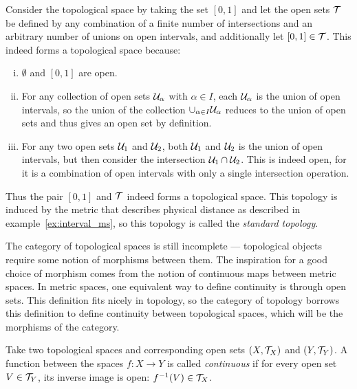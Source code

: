 \documentclass[../sean_thesis.tex]{subfiles}
\begin{document}
\begin{example}
	Consider the topological space by taking the set $[0,1]$ and let the open sets $\mathcal{T}$ be defined by any combination of a finite number of intersections and an arbitrary number of unions on open intervals, and additionally let $[0,1] \in \mathcal{T}$. This indeed forms a topological space because: 
\vspace{-\parskip}
	\begin{enumerate}[(i)]	
		\item $\emptyset$ and $[0,1]$ are open. 
		\item For any collection of open sets $\mathcal{U}_\alpha$ with $\alpha \in I$, each $\mathcal{U}_\alpha$ is the union of open intervals, so the union of the collection $\cup_{\alpha\in I} \mathcal{U}_\alpha$ reduces to the union of open sets and thus gives an open set by definition.
		\item For any two open sets $\mathcal{U}_1$ and $\mathcal{U}_2$, both $\mathcal{U}_1$ and $\mathcal{U}_2$ is the union of open intervals, but then consider the intersection $\mathcal{U}_1 \cap \mathcal{U}_2$. This is indeed open, for it is a combination of open intervals with only a single intersection operation.
	\end{enumerate}
	\vspace{-\parskip}
	Thus the pair $[0,1]$ and $\mathcal{T}$ indeed forms a topological space. This topology is induced by the metric that describes physical distance as described in example~\ref{ex:interval_ms}, so this topology is called the \emph{standard topology}.
\end{example}

The category of topological spaces is still incomplete --- topological objects require some notion of morphisms between them. The inspiration for a good choice of morphism comes from the notion of continuous maps between metric spaces. In metric spaces, one equivalent way to define continuity is through open sets. This definition fits nicely in topology, so the category of topology borrows this definition to define continuity between topological spaces, which will be the morphisms of the category.

\begin{definition}
	Take two topological spaces and corresponding open sets $(X, \mathcal{T}_X)$ and $(Y, \mathcal{T}_Y)$. A function between the spaces $f: X \to Y$ is called \emph{continuous} if for every open set $V \in \mathcal{T}_Y$, its inverse image is open: $f^{-1}(V) \in \mathcal{T}_X$.
\end{definition}
\end{document}
